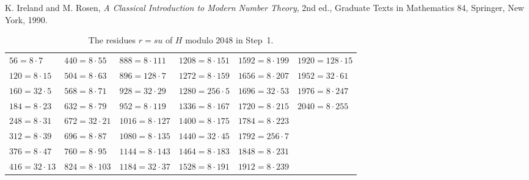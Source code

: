 \documentclass[11pt]{article}
\begin{document}
\begin{thebibliography}{9}
 K. Ireland and M. Rosen, \emph{A Classical Introduction to Modern Number Theory}, 2nd ed., Graduate Texts in Mathematics 84, Springer, New York, 1990.
\end{thebibliography}

\begin{table}[ht]
\centering\footnotesize
\caption{The residues $r=su$ of $H$ modulo $2048$ in Step~1.}\label{tab:res}
\begin{tabular}{llllll}
\hline
$56=8\cdot7$ & $440=8\cdot55$ & $888=8\cdot111$ & $1208=8\cdot151$ & $1592=8\cdot199$ & $1920=128\cdot15$\\
$120=8\cdot15$ & $504=8\cdot63$ & $896=128\cdot7$ & $1272=8\cdot159$ & $1656=8\cdot207$ & $1952=32\cdot61$\\
$160=32\cdot5$ & $568=8\cdot71$ & $928=32\cdot29$ & $1280=256\cdot5$ & $1696=32\cdot53$ & $1976=8\cdot247$\\
$184=8\cdot23$ & $632=8\cdot79$ & $952=8\cdot119$ & $1336=8\cdot167$ & $1720=8\cdot215$ & $2040=8\cdot255$\\
$248=8\cdot31$ & $672=32\cdot21$ & $1016=8\cdot127$ & $1400=8\cdot175$ & $1784=8\cdot223$ & \\
$312=8\cdot39$ & $696=8\cdot87$ & $1080=8\cdot135$ & $1440=32\cdot45$ & $1792=256\cdot7$ & \\
$376=8\cdot47$ & $760=8\cdot95$ & $1144=8\cdot143$ & $1464=8\cdot183$ & $1848=8\cdot231$ & \\
$416=32\cdot13$ & $824=8\cdot103$ & $1184=32\cdot37$ & $1528=8\cdot191$ & $1912=8\cdot239$ & \\
\hline
\end{tabular}
\end{table}
\end{document}
